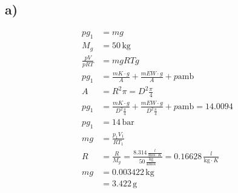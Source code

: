 

\subsection*{a)}
\begin{align*}
    p g_1 &= m g \\
    M_g &= 50 \, \text{kg} \\
    \frac{p V}{p R T} &= m g R T g \\
    p g_1 &= \frac{m K \cdot g}{A} + \frac{m E W \cdot g}{A} + p \text{amb} \\
    A &= R^2 \pi = D^2 \frac{\pi}{4} \\
    p g_1 &= \frac{m K \cdot g}{D^2 \frac{\pi}{4}} + \frac{m E W \cdot g}{D^2 \frac{\pi}{4}} + p \text{amb} = 14.0094 \\
    p g_1 &= 14 \, \text{bar} \\
    m g &= \frac{p_1 V_1}{R T_1} \\
    R &= \frac{R}{M_g} = \frac{8.314 \, \frac{l}{\text{mol} \cdot K}}{50 \, \frac{\text{kg}}{\text{kmol}}} = 0.16628 \, \frac{l}{\text{kg} \cdot K} \\
    m g &= 0.003422 \, \text{kg} \\
    &= 3.422 \, \text{g}
\end{align*}